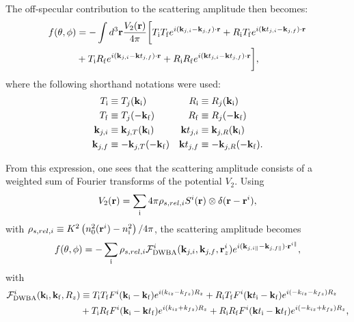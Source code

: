 The off-specular contribution to the scattering amplitude then becomes:
\begin{align*}
  f(\theta, \phi) &= -\int d^3\mathbf{r} \frac{V_2(\mathbf{r})}{4\pi} \biggl[ T_{\rm i}T_{\rm f}e^{i(\mathbf{k}_{j,i}-\mathbf{k}_{j,f})\cdot\mathbf{r}} + R_{\rm i}T_{\rm f}e^{i(\mathbf{k} t_{j,i}-\mathbf{k}_{j,f})\cdot\mathbf{r}} \\
   & + T_{\rm i}R_{\rm f}e^{i(\mathbf{k}_{j,i}-\mathbf{k} t_{j,f})\cdot\mathbf{r}} + R_{\rm i}R_{\rm f}e^{i(\mathbf{k} t_{j,i}-\mathbf{k} t_{j,f})\cdot\mathbf{r}} \biggr],
\end{align*}
where the following shorthand notations were used:
\begin{align*}
  T_{\rm i} &\equiv  T_j(\mathbf{k}_{\rm i}) & R_{\rm i} &\equiv  R_j(\mathbf{k}_{\rm i})  \\
  T_{\rm f} &\equiv  T_j(-\mathbf{k}_{\rm f}) & R_{\rm f} &\equiv  R_j(-\mathbf{k}_{\rm f}) \\
  \mathbf{k}_{j,i} &\equiv \mathbf{k}_{j,T}(\mathbf{k}_{\rm i}) & \mathbf{k} t_{j,i} &\equiv \mathbf{k}_{j,R}(\mathbf{k}_{\rm i})  \\
  \mathbf{k}_{j,f} &\equiv -\mathbf{k}_{j,T}(-\mathbf{k}_{\rm f}) & \mathbf{k} t_{j,f} &\equiv -\mathbf{k}_{j,R}(-\mathbf{k}_{\rm f}).
\end{align*}

From this expression, one sees that the scattering amplitude consists of a weighted sum of Fourier transforms of the potential $V_2$. Using
\begin{equation*}
  V_2(\mathbf{r}) = \sum_{\rm i} 4\pi \rho_{s,rel,i} S^i(\mathbf{r}) \otimes \delta(\mathbf{r} - \mathbf{r}^i),
\end{equation*}
with $\rho_{s,rel,i}\equiv  K^2\left( n_0^2(\mathbf{r}^i) - n_{\rm i}^2 \right)/4\pi$, the scattering amplitude becomes
\begin{equation*}
  f(\theta, \phi) = -\sum_{\rm i}  \rho_{s,rel,i} \mathcal{F}^i_{\text{DWBA}}(\mathbf{k}_{j,i},\mathbf{k}_{j,f},\mathbf{r}^i_z)e^{i(\mathbf{k}_{j,i\parallel}-\mathbf{k}_{j,f\parallel})\cdot \mathbf{r}^{i\parallel} },
\end{equation*}
with
\begin{align*}
  \mathcal{F}^i_\text{DWBA}(\mathbf{k}_{\rm i},\mathbf{k}_{\rm f},R_z) & \equiv T_{\rm i}T_{\rm f}F^i(\mathbf{k}_{\rm i}-\mathbf{k}_{\rm f})e^{i(k_{iz}-k_{fz})R_z} + R_{\rm i}T_{\rm f}F^i(\mathbf{k} t_{\rm i}-\mathbf{k}_{\rm f})e^{i(-k_{iz}-k_{fz})R_z} \\
  & + T_{\rm i}R_{\rm f}F^i(\mathbf{k}_{\rm i}-\mathbf{k} t_{\rm f})e^{i(k_{iz}+k_{fz})R_z} + R_{\rm i}R_{\rm f}F^i(\mathbf{k} t_{\rm i}-\mathbf{k} t_{\rm f})e^{i(-k_{iz}+k_{fz})R_z},
\end{align*}

